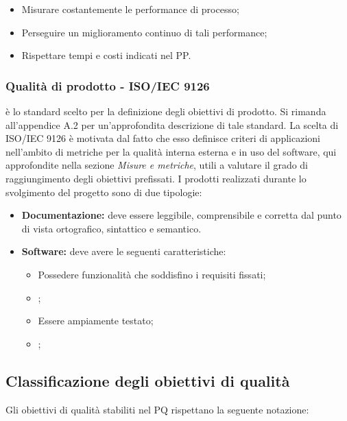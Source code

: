 \documentclass[../NormediProgetto.tex]{subfiles}
\begin{document}
\begin{itemize}
	\item Misurare costantemente le performance di processo;
	\item Perseguire un miglioramento continuo di tali performance;
	\item Rispettare tempi e costi indicati nel PP.
\end{itemize} 

\subsubsection{Qualità di prodotto - ISO/IEC 9126}

 è lo standard scelto per la definizione degli obiettivi di prodotto. Si rimanda all'appendice A.2 per un'approfondita descrizione di tale standard.
La scelta di ISO/IEC 9126 è motivata dal fatto che esso definisce criteri di applicazioni nell'ambito di metriche per la qualità interna esterna e in uso del software, qui approfondite nella sezione \textit{Misure e metriche}, utili a valutare il grado di raggiungimento degli obiettivi prefissati.
I prodotti realizzati durante lo svolgimento del progetto sono di due tipologie:

\begin{itemize}
	\item \textbf{Documentazione:} deve essere leggibile, comprensibile e corretta dal punto di vista ortografico, sintattico e semantico.
	
	\item \textbf{Software:} deve avere le seguenti caratteristiche:
	\begin{itemize}
		\item Possedere funzionalità che soddisfino i requisiti fissati;
		\item {};
		\item Essere ampiamente testato;
		\item {};
	\end{itemize}
\end{itemize}

\subsection{Classificazione degli obiettivi di qualità}

Gli obiettivi di qualità stabiliti nel PQ rispettano la seguente notazione:
\end{document}
